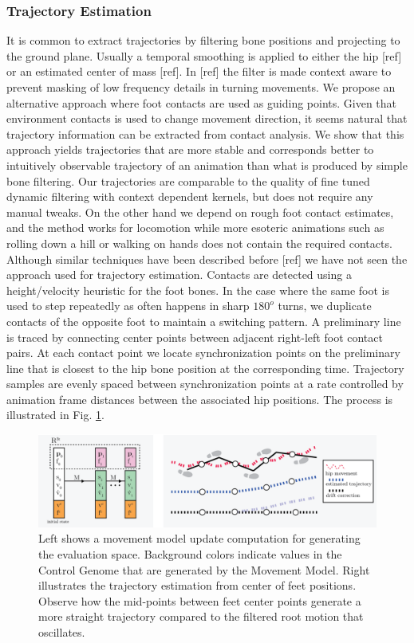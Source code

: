 \subsubsection{\bf Trajectory Estimation}
It is common to extract trajectories by filtering bone positions and projecting to the ground plane. Usually a temporal smoothing is applied to either the hip [ref] or an estimated center of mass [ref]. In [ref] the filter is made context aware to prevent masking of low frequency details in turning movements. We propose an alternative approach where foot contacts are used as guiding points. Given that environment contacts is used to change movement direction, it seems natural that trajectory information can be extracted from contact analysis. We show that this approach yields trajectories that are more stable and corresponds better to intuitively observable trajectory of an animation than what is produced by simple bone filtering. Our trajectories are comparable to the quality of fine tuned dynamic filtering with context dependent kernels, but does not require any manual tweaks. On the other hand we depend on rough foot contact estimates, and the method works for locomotion while more esoteric animations such as rolling down a hill or walking on hands does not contain the required contacts.
%
Although similar techniques have been described before [ref] we have not seen the approach used for trajectory estimation.
Contacts are detected using a height/velocity heuristic for the foot bones. In the case where the same foot is used to step repeatedly as often happens in sharp $180^o$ turns, we duplicate contacts of the opposite foot to maintain a switching pattern. A preliminary line is traced by connecting center points between adjacent right-left foot contact pairs. At each contact point we locate synchronization points on the preliminary line that is closest to the hip bone position at the corresponding time. Trajectory samples are evenly spaced between synchronization points at a rate controlled by animation frame distances between the associated hip positions. The process is illustrated in Fig. \ref{fig:method:trajectory}. 
\begin{figure}
    \centering
    \includegraphics[width=1\columnwidth]{img/trajectory.png}
    \caption{Left shows a movement model update computation for generating the evaluation space. Background colors indicate values in the Control Genome that are generated by the Movement Model.  Right illustrates the trajectory estimation from center of feet positions. Observe how the mid-points between feet center points generate a more straight trajectory compared to the filtered root motion that oscillates.}
    \label{fig:method:trajectory}
\end{figure}

